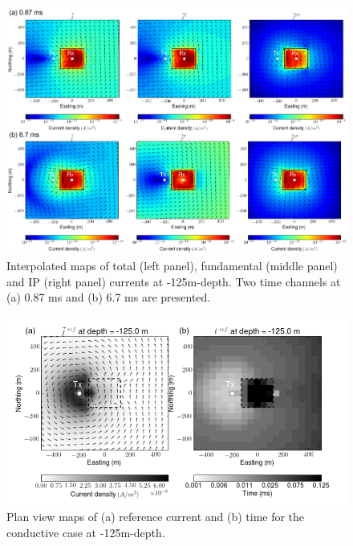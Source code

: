 \documentclass[a4paper, 11pt]{article}
\begin{document}
\begin{figure}[htb]
  \centering
  \includegraphics[width=1\textwidth]{figures/IPcurrent_Plan.png}
  \caption{Interpolated maps of total (left panel), fundamental (middle panel) and IP (right panel) currents at -125m-depth. Two time channels at (a) 0.87 ms and (b) 6.7 ms are presented.}
  \label{F:IPcurrent_Plan}
\end{figure}

\begin{figure}[htb]
  \centering
  \includegraphics[width=1\textwidth]{figures/Jref_tref.png}
  \caption{Plan view maps of (a) reference current and (b) time for the conductive case at -125m-depth.}
  \label{F:Jref_tref}
\end{figure}
\clearpage

\end{document}
